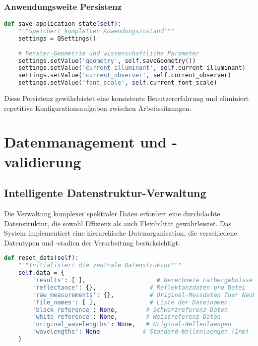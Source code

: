 \subsubsection{Anwendungsweite Persistenz}

\begin{lstlisting}[language=Python, caption=Anwendungszustand-Persistenz]
def save_application_state(self):
    """Speichert kompletten Anwendungszustand"""
    settings = QSettings()
    
    # Fenster-Geometrie und wissenschaftliche Parameter
    settings.setValue('geometry', self.saveGeometry())
    settings.setValue('current_illuminant', self.current_illuminant)
    settings.setValue('current_observer', self.current_observer)
    settings.setValue('font_scale', self.current_font_scale)
\end{lstlisting}

Diese Persistenz gewährleistet eine konsistente Benutzererfahrung und eliminiert repetitive Konfigurationsaufgaben zwischen Arbeitssitzungen.

\section{Datenmanagement und -validierung}

\subsection{Intelligente Datenstruktur-Verwaltung}

Die Verwaltung komplexer spektraler Daten erfordert eine durchdachte Datenstruktur, die sowohl Effizienz als auch Flexibilität gewährleistet. Das System implementiert eine hierarchische Datenorganisation, die verschiedene Datentypen und -stadien der Verarbeitung berücksichtigt:

\begin{lstlisting}[language=Python, caption=Zentrale Datenstruktur-Initialisierung]
def reset_data(self):
    """Initialisiert die zentrale Datenstruktur"""
    self.data = {
        'results': [ ],                    # Berechnete Farbergebnisse
        'reflectance': {},               # Reflektanzdaten pro Datei
        'raw_measurements': {},          # Original-Messdaten fuer Neuberechnung
        'file_names': [ ],               # Liste der Dateinamen
        'black_reference': None,        # Schwarzreferenz-Daten
        'white_reference': None,        # Weissreferenz-Daten
        'original_wavelengths': None,   # Original-Wellenlaengen
        'wavelengths': None            # Standard-Wellenlaengen (1nm)
    }
\end{lstlisting}

